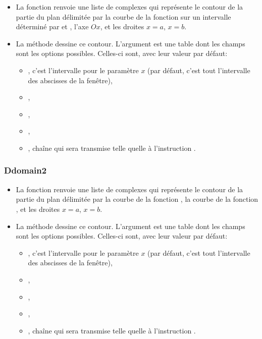 \begin{itemize}
    \item La fonction  renvoie une liste de complexes qui représente le contour de la partie du plan délimitée par la courbe de la fonction  sur un intervalle déterminé par  et , l'axe $Ox$, et les droites \(x=a\), \(x=b\).

    \item La méthode  dessine ce contour. L'argument  est une table dont les champs sont les options possibles. Celles-ci sont, avec leur valeur par défaut:
  \begin{itemize}
      \item {}, c'est l'intervalle pour le paramètre $x$ (par défaut, c'est tout l'intervalle des abscisses de la fenêtre), 
      \item {}, 
      \item {},
      \item {},
      \item {}, chaîne qui sera transmise telle quelle à l'instruction \drawcmd.
  \end{itemize}
\end{itemize}
    
\subsubsection{Ddomain2}

\begin{itemize}
    \item La fonction  renvoie une liste de complexes qui représente le contour de la partie du plan délimitée par la courbe de la fonction , la courbe de la fonction , et les droites \(x=a\), \(x=b\).
    
    \item La méthode  dessine ce contour. L'argument  est une table dont les champs sont les options possibles. Celles-ci sont, avec leur valeur par défaut:
  \begin{itemize}
      \item {}, c'est l'intervalle pour le paramètre $x$ (par défaut, c'est tout l'intervalle des abscisses de la fenêtre), 
      \item {}, 
      \item {},
      \item {},
      \item {}, chaîne qui sera transmise telle quelle à l'instruction \drawcmd.
  \end{itemize}
\end{itemize}
  
